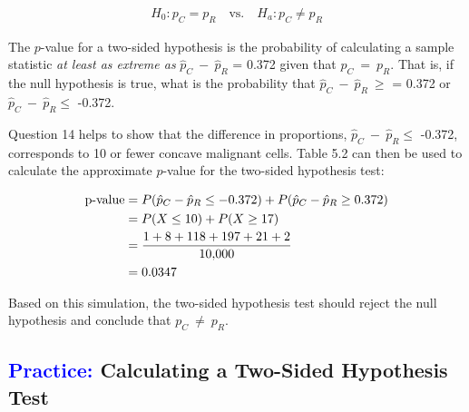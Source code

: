 \documentclass[
]{report}
\begin{document}
\begin{align}\label{5.2}
H_0: p_C = p_R \quad\text{vs.}\quad H_a: p_C \neq p_R 
\tag{5.2}
\end{align}

The \(\scriptstyle p\)-value for a two-sided hypothesis is the probability of calculating a sample statistic \emph{at least as extreme as} \(\scriptstyle \hat p_C \ -\  \hat p_R\) = 0.372 given that \(\scriptstyle p_C \ =\  p_R\). That is, if the null hypothesis is true, what is the probability that \(\scriptstyle \hat p_C \ -\  \hat p_R \ \ge\) = 0.372 or \(\scriptstyle \hat p_C \ -\  \hat p_R \le\) -0.372.

Question 14 helps to show that the difference in proportions, \(\scriptstyle \hat p_C \ -\  \hat p_R \le\) -0.372, corresponds to 10 or fewer concave malignant cells. Table 5.2 can then be used to calculate the approximate \(\scriptstyle p\)-value for the two-sided hypothesis test:

\begin{align}
\text{p-value}
&= P(\hat p_C - \hat p_R \le -0.372) + P(\hat p_C - \hat p_R \ge 0.372) \notag \\ \notag
&= P(X \le 10) + P(X \ge 17) \\ \notag 
&= \frac{1 + 8 + 118 + 197 + 21 + 2}{10{,}000} \\ \notag
&= 0.0347 \notag
\end{align}

Based on this simulation, the two-sided hypothesis test should reject the null hypothesis and conclude that \(\scriptstyle p_C \ \neq \  p_R\).

\hypertarget{calculating-a-two-sided-hypothesis-test}{%
\subsection*{\texorpdfstring{\textcolor{blue}{Practice:} Calculating a Two-Sided Hypothesis Test}{ Calculating a Two-Sided Hypothesis Test}}\label{calculating-a-two-sided-hypothesis-test}}
\end{document}

